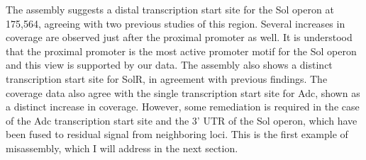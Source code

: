 The assembly suggests a distal transcription start site for the Sol operon at 175,564, agreeing with two previous studies of this region. Several increases in coverage are observed just after the proximal promoter as well. It is understood that the proximal promoter is the most active promoter motif for the Sol operon and this view is supported by our data. The assembly also shows a distinct transcription start site for SolR, in agreement with previous findings. The coverage data also agree with the single transcription start site for Adc, shown as a distinct increase in coverage. However, some remediation is required in the case of the Adc transcription start site and the 3' UTR of the Sol operon, which have been fused to residual signal from neighboring loci. This is the first example of misassembly, which I will address in the next section.
